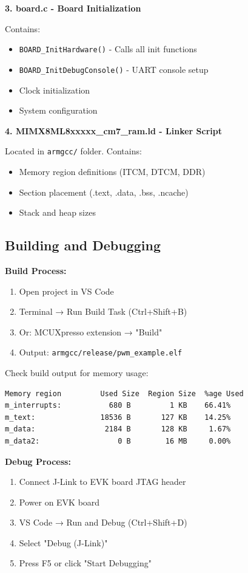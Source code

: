 \documentclass[12pt,a4paper]{report}
\begin{document}
\textbf{3. board.c - Board Initialization}

Contains:
\begin{itemize}
    \item \texttt{BOARD\_InitHardware()} - Calls all init functions
    \item \texttt{BOARD\_InitDebugConsole()} - UART console setup
    \item Clock initialization
    \item System configuration
\end{itemize}

\textbf{4. MIMX8ML8xxxxx\_cm7\_ram.ld - Linker Script}

Located in \texttt{armgcc/} folder. Contains:
\begin{itemize}
    \item Memory region definitions (ITCM, DTCM, DDR)
    \item Section placement (.text, .data, .bss, .ncache)
    \item Stack and heap sizes
\end{itemize}

\subsection{Building and Debugging}

\textbf{Build Process:}

\begin{enumerate}
    \item Open project in VS Code
    \item Terminal → Run Build Task (Ctrl+Shift+B)
    \item Or: MCUXpresso extension → "Build"
    \item Output: \texttt{armgcc/release/pwm\_example.elf}
\end{enumerate}

Check build output for memory usage:
\begin{lstlisting}
Memory region         Used Size  Region Size  %age Used
m_interrupts:           680 B         1 KB    66.41%
m_text:               18536 B       127 KB    14.25%
m_data:                2184 B       128 KB     1.67%
m_data2:                  0 B        16 MB     0.00%
\end{lstlisting}


\textbf{Debug Process:}

\begin{enumerate}
    \item Connect J-Link to EVK board JTAG header
    \item Power on EVK board
    \item VS Code → Run and Debug (Ctrl+Shift+D)
    \item Select "Debug (J-Link)"
    \item Press F5 or click "Start Debugging"
\end{enumerate}
\end{document}

